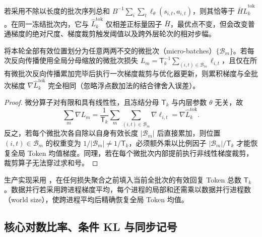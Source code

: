 \documentclass[lang=cn,scheme=chinese,openany]{elegantbook}
\begin{document}
若采用不除以长度的批次序列总和 $B^{-1}\sum_i\sum_t\ell_\theta(s_{i,t},a_{i,t})$，则其恰等于 $\bar H\widehat L_k^{\mathrm{tok}}$。在同一冻结批次内，它与 $\widehat L_k^{\mathrm{tok}}$ 仅相差正标量因子 $\bar H$，最优点不变，但会改变普通梯度的绝对尺度、梯度裁剪触发阈值以及跨外层轮次的相对步幅。

\begin{proposition}
\label{prop:micro-batch-invariance}
将本轮全部有效位置划分为任意两两不交的微批次（micro-batches）$\{\mathcal B_m\}$。若每次反向传播使用全局分母缩放的微批次损失 $L_m=\mathsf T_k^{-1}\sum_{(i,t)\in\mathcal B_m}\ell_{i,t}$，且仅在所有微批次反向传播累加完毕后执行一次梯度裁剪与优化器更新，则累积梯度与全批次梯度 $\nabla\widehat L_k^{\mathrm{tok}}$ 完全相同（忽略浮点数加法的结合律舍入误差）。
\end{proposition}
\begin{proof}
微分算子对有限和具有线性性，且冻结分母 $\mathsf T_k$ 与内层参数 $\theta$ 无关，故
\begin{equation}
 \sum_m\nabla L_m
 =\frac1{\mathsf T_k}\sum_m\sum_{(i,t)\in\mathcal B_m}\nabla\ell_{i,t}
 =\nabla\widehat L_k^{\mathrm{tok}}.
\end{equation}
反之，若每个微批次各自除以自身有效长度 $|\mathcal B_m|$ 后直接累加，则位置 $(i,t)\in\mathcal B_m$ 的权重变为 $1/|\mathcal B_m|\ne 1/\mathsf T_k$，必须额外乘以比例因子 $|\mathcal B_m|/\mathsf T_k$ 才能恢复全局 Token 均值梯度。同理，若在每个微批次内部提前执行非线性梯度裁剪，裁剪算子无法穿过求和号。
\end{proof}

生产实现采用 ，在任何损失聚合之前填入当前全批次的有效回复 Token 总数 $\mathsf T_k$。数据并行若采用跨进程梯度平均，每个进程的局部和还需乘以数据并行进程数（world size），使跨进程平均后精确恢复全局 Token 均值。

\subsection{核心对数比率、条件 KL 与同步记号}
\end{document}
